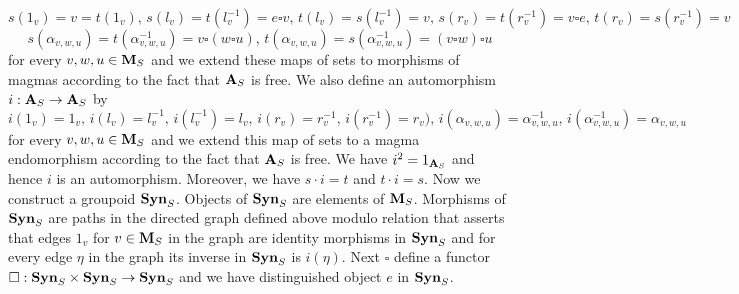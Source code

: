 $$s(1_v) = v = t(1_v),\,s(l_v) = t(l_v^{-1}) = e\square v,\,t(l_v) = s(l^{-1}_v) = v,\,s(r_v)= t(r^{-1}_v) = v\square e,\,t(r_v)= s(r^{-1}_v) = v$$
$$s(\alpha_{v,w,u})= t(\alpha^{-1}_{v,w,u})=v\square(w\square u),\,t(\alpha_{v,w,u})= s(\alpha^{-1}_{v,w,u})=(v\square w)\square u$$
for every $v,w,u\in \mathbf{M}_S$ and we extend these maps of sets to morphisms of magmas according to the fact that $\mathbf{A}_S$ is free. We also define an automorphism $i:\mathbf{A}_S\rightarrow \mathbf{A}_S$ by
$$i(1_v)= 1_v,\,i(l_v)=l^{-1}_v,\,i(l^{-1}_v)=l_v,\,i(r_v)=r^{-1}_v,\,i(r^{-1}_v)=r_v),\,i(\alpha_{v,w,u})=\alpha^{-1}_{v,w,u},\,i(\alpha^{-1}_{v,w,u})=\alpha_{v,w,u}$$
for every $v,w,u\in \mathbf{M}_S$ and we extend this map of sets to a magma endomorphism according to the fact that $\mathbf{A}_S$ is free. We have $i^2 = 1_{\mathbf{A}_S}$ and hence $i$ is an automorphism. Moreover, we have $s\cdot i = t$ and $t\cdot i= s$. Now we construct a groupoid $\mathbf{Syn}_S$. Objects of $\mathbf{Syn}_S$ are elements of $\mathbf{M}_S$. Morphisms of $\mathbf{Syn}_S$ are paths in the directed graph defined above modulo relation that asserts that edges $1_v$ for $v\in \mathbf{M}_S$ in the graph are identity morphisms in $\mathbf{Syn}_S$ and for every edge $\eta$ in the graph its inverse in $\mathbf{Syn}_S$ is $i(\eta)$. Next $\square$ define a functor $\square:\mathbf{Syn}_S\times \mathbf{Syn}_S \rightarrow \mathbf{Syn}_S$ and we have distinguished object $e$ in $\mathbf{Syn}_S$.

